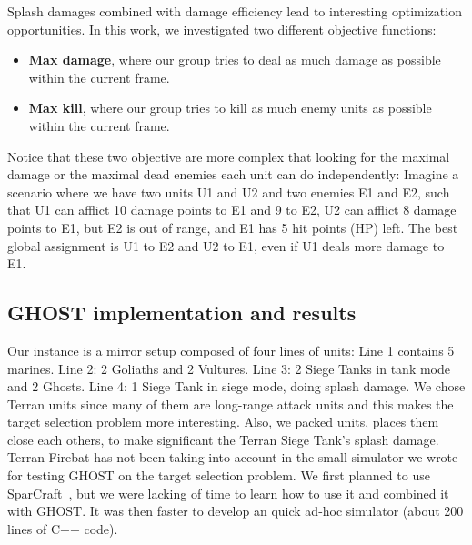 \documentclass[journal]{IEEEtran}
\newcommand{\ghost}{\textsc{GHOST}\xspace}
\begin{document}
Splash  damages combined  with damage  efficiency lead  to interesting
optimization  opportunities.   In  this   work,  we  investigated  two
different objective functions:
\begin{itemize}
\item {\bf Max  damage}, where our group tries to  deal as much damage
  as possible within the current frame.
\item {\bf  Max kill},  where our  group tries to  kill as  much enemy
  units as possible within the current frame.
\end{itemize}
Notice that these two objective are  more complex that looking for the
maximal  damage  or  the  maximal   dead  enemies  each  unit  can  do
independently: Imagine  a scenario where we  have two units U1  and U2
and two enemies E1  and E2, such that U1 can  afflict 10 damage points
to E1 and 9 to E2, U2 can afflict 8 damage points to E1, but E2 is out
of  range,  and E1  has  5  hit points  (HP)  left.   The best  global
assignment is U1 to  E2 and U2 to E1, even if U1  deals more damage to
E1.

\subsection{\ghost implementation and results}

Our instance is a mirror setup composed of four lines of units: Line 1
contains 5 marines. Line 2: 2 Goliaths and 2 Vultures. Line 3: 2 Siege
Tanks in tank mode  and 2 Ghosts. Line 4: 1 Siege  Tank in siege mode,
doing splash  damage.  We chose  Terran units  since many of  them are
long-range attack  units and this  makes the target  selection problem
more  interesting.  Also,  we  packed units,  places  them close  each
others, to make significant the Terran Siege Tank's splash damage.
Terran Firebat has not been taking into account in the small simulator
we wrote for testing \ghost on the target selection problem.  We first
planned    to    use   SparCraft~\cite{ChurchillB11,    ChurchillSB12,
  ChurchillB12}, but  we were lacking of  time to learn how  to use it
and combined  it with \ghost. It  was then faster to  develop an quick
ad-hoc simulator (about 200 lines of C++ code).
\end{document}
